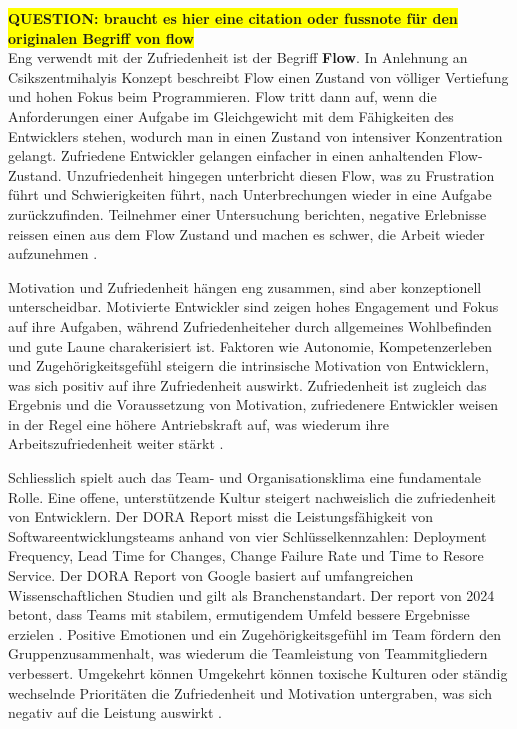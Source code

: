 \documentclass[12pt,a4paper]{report}
\newcommand{\question}[1]{\colorbox{yellow}{\textbf{QUESTION: #1}}\\}
\begin{document}
\question{braucht es hier eine citation oder fussnote für den originalen Begriff von flow}
Eng verwendt mit der Zufriedenheit ist der Begriff \textbf{Flow}. In Anlehnung an Csikszentmihalyis Konzept beschreibt
Flow einen Zustand von völliger Vertiefung und hohen Fokus beim Programmieren. Flow tritt dann auf, wenn die Anforderungen
einer Aufgabe im Gleichgewicht mit dem Fähigkeiten des Entwicklers stehen, wodurch man in einen Zustand von intensiver 
Konzentration gelangt. Zufriedene Entwickler gelangen einfacher in einen anhaltenden Flow-Zustand. Unzufriedenheit
hingegen unterbricht diesen Flow, was zu Frustration führt und Schwierigkeiten führt, nach Unterbrechungen wieder in
eine Aufgabe zurückzufinden. Teilnehmer einer Untersuchung berichten, negative Erlebnisse reissen einen aus dem Flow
Zustand und machen es schwer, die Arbeit wieder aufzunehmen \cite{sadowski_happiness_2019}.

Motivation und Zufriedenheit hängen eng zusammen, sind aber konzeptionell unterscheidbar. Motivierte Entwickler sind
zeigen hohes Engagement und Fokus auf ihre Aufgaben, während Zufriedenheiteher durch allgemeines Wohlbefinden und gute
Laune charakerisiert ist. Faktoren wie Autonomie, Kompetenzerleben und Zugehörigkeitsgefühl steigern die intrinsische 
Motivation von Entwicklern, was sich positiv auf ihre Zufriedenheit auswirkt. Zufriedenheit ist zugleich das Ergebnis und
die Voraussetzung von Motivation, zufriedenere Entwickler weisen in der Regel eine höhere Antriebskraft auf, was wiederum ihre
Arbeitszufriedenheit weiter stärkt \cite{franca_motivation_2020}.

Schliesslich spielt auch das Team- und Organisationsklima eine fundamentale Rolle. Eine offene, unterstützende Kultur steigert
nachweislich die zufriedenheit von Entwicklern. Der DORA Report misst die Leistungsfähigkeit von Softwareentwicklungsteams anhand
von vier Schlüsselkennzahlen: Deployment Frequency, Lead Time for Changes, Change Failure Rate und Time to Resore Service. Der DORA
Report von Google basiert auf umfangreichen Wissenschaftlichen Studien und gilt als Branchenstandart. Der report von 2024 betont,
dass Teams mit stabilem, ermutigendem Umfeld bessere Ergebnisse erzielen \cite{google_dora_2024}. Positive Emotionen und ein 
Zugehörigkeitsgefühl im Team fördern den Gruppenzusammenhalt, was wiederum die Teamleistung von Teammitgliedern verbessert. 
Umgekehrt können Umgekehrt können toxische Kulturen oder ständig wechselnde Prioritäten die Zufriedenheit und Motivation 
untergraben, was sich negativ auf die Leistung auswirkt \cite{sadowski_happiness_2019}.
\end{document}
